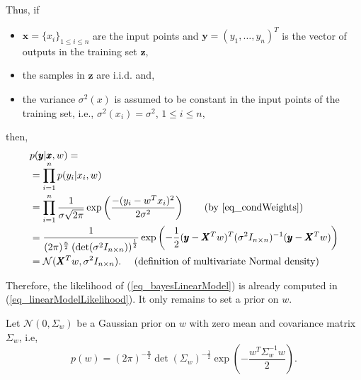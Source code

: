 Thus, if
\begin{itemize} 
  \item $\pmb{x} = \{x_i\}_{1 \leq i \leq n}$ are the input points and $\pmb{y} = (y_1, \dots, y_n)^T$ is the vector of outputs in the training set $\pmb{z}$,
  \item the samples in $\pmb{z}$ are i.i.d. and,
  \item the variance $\sigma^2(x)$ is assumed to be constant in the input points of the training set, i.e., $\sigma^2(x_i) = \sigma^2$, $1 \leq i \leq n$,
\end{itemize}  
then,
\begin{equation} \label{eq_linearModelLikelihood} 
 \begin{array}{l}    
    p(\pmb{y} | \pmb{x},w) = \\
   \begin{aligned}
       &= \prod_{i=1}^{n} p(y_i | x_i,w) \\ 
       &= \prod_{i=1}^{n} \frac{1}{\sigma\sqrt{2\pi}}\exp\left( \frac{-(y_i-w^Tx_i)^2}{2\sigma^2} \right) \ \ \ \ \ \ \text{(by \ref{eq_condWeights})} \\
       &= \frac{1}{(2\pi)^{\frac{n}{2}} 
             \left( \textup{det}(\sigma^2I_{n \times n}) \right)^{\frac{1}{2}}}
             \exp\left( 
             -\frac{1}{2}
             (\pmb{y} -  \pmb{X}^Tw)^T
             (\sigma^2I_{n \times n})^{-1}
             (\pmb{y} -  \pmb{X}^Tw)
             \right) \\
       &= \mathcal{N}(\pmb{X}^Tw, \sigma^2I_{n \times n}). \ \ \ \ \text{(definition of multivariate Normal density)}  
  \end{aligned} \\
 \end{array}
\end{equation}

Therefore, the likelihood of (\ref{eq_bayesLinearModel}) is already computed in (\ref{eq_linearModelLikelihood}). It only remains to set a prior on $w$.

Let $\mathcal{N}(0,\Sigma_w)$ be a Gaussian prior on $w$ with zero mean and covariance matrix $\Sigma_w$, i.e,
\begin{equation} \label{eq_linearModelPrior}
  p(w) = (2\pi)^{-\frac{n}{2}} \det(\Sigma_w)^{-\frac{1}{2}} \exp\left( -\frac{w^T\Sigma_w^{-1}w}{2} \right).
\end{equation}

